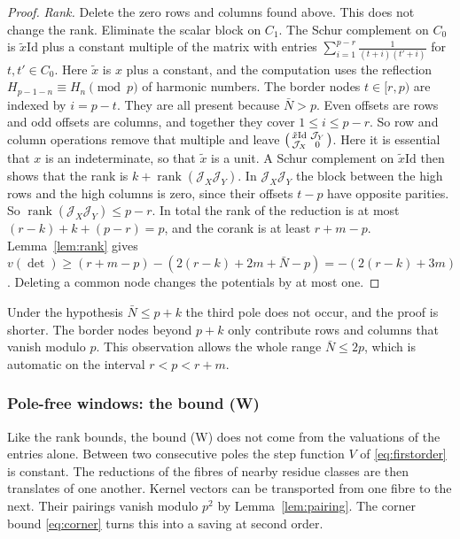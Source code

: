 \documentclass[11pt]{amsart}
\theoremstyle{definition}
\theoremstyle{remark}
\numberwithin{equation}{section}
\newcommand{\rank}{\operatorname{rank}}
\newcommand{\Id}{\mathrm{Id}}
\begin{document}
\begin{proof}
\emph{Rank.} Delete the zero rows and columns found above. This does not change the rank. Eliminate the scalar block on
$C_1$. The Schur complement on $C_0$ is $\tilde x\Id$ plus a constant multiple of the matrix with entries
$\sum_{i=1}^{p-r}\frac1{(t+i)(t'+i)}$ for $t,t'\in C_0$. Here $\tilde x$ is $x$ plus a constant, and the computation uses
the reflection $H_{p-1-n}\equiv H_n\pmod p$ of harmonic numbers. The border nodes $t\in[r,p)$ are indexed by $i=p-t$.
They are all present because $\bar N>p$. Even offsets are rows and odd offsets are columns, and together they cover
$1\le i\le p-r$. So row and column operations remove that multiple and leave
$\begin{psmallmatrix}\tilde x\Id&\mathcal J_Y\\ \mathcal J_X&0\end{psmallmatrix}$. Here it is essential that $x$ is an
indeterminate, so that $\tilde x$ is a unit. A Schur complement on $\tilde x\Id$ then shows that the rank is
$k+\rank(\mathcal J_X\mathcal J_Y)$. In $\mathcal J_X\mathcal J_Y$ the block between the high rows and the high columns is
zero, since their offsets $t-p$ have opposite parities. So $\rank(\mathcal J_X\mathcal J_Y)\le p-r$. In total the rank of
the reduction is at most $(r-k)+k+(p-r)=p$, and the corank is at least $r+m-p$. Lemma~\ref{lem:rank} gives
$v(\det)\ge(r+m-p)-(2(r-k)+2m+\bar N-p)=-(2(r-k)+3m)$. Deleting a common node changes the potentials by at most one.
\end{proof}

Under the hypothesis $\bar N\le p+k$ the third pole does not occur, and the proof is shorter. The border nodes beyond $p+k$
only contribute rows and columns that vanish modulo $p$. This observation allows the whole range $\bar N\le2p$, which is
automatic on the interval $r<p<r+m$.

\subsubsection{Pole-free windows: the bound (W)}\label{sssec:window}
Like the rank bounds, the bound (W) does not come from the valuations of the entries alone. Between two consecutive
poles the step function $V$ of \eqref{eq:firstorder} is constant. The reductions of the fibres of nearby residue classes
are then translates of one another. Kernel vectors can be transported from one fibre to the next. Their pairings vanish
modulo $p^2$ by Lemma~\ref{lem:pairing}. The corner bound \eqref{eq:corner} turns this into a saving at second order.
\end{document}
